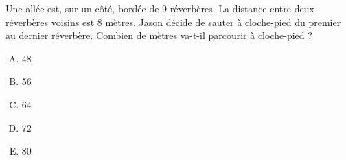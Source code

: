 Une allée est, sur un côté, bordée de 9 réverbères. La distance entre
deux réverbères voisins est 8 mètres. Jason décide de sauter à
cloche-pied du premier au dernier réverbère. Combien de mètres va-t-il
parcourir à cloche-pied ?
\begin{multicols}{5}
  \begin{enumerate}[A)]
  \item 48
  \item 56
  \item 64
  \item 72
  \item 80
  \end{enumerate}
\end{multicols}
